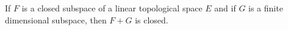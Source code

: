 If $F$ is a closed subspace of a linear topological space $E$ and if $G$ is a finite dimensional subspace, then $F + G$ is closed.
